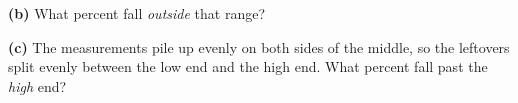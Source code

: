 \documentclass[12pt]{article}
\begin{document}
\begin{enumerate}[leftmargin=1.7em, itemsep=0.13in]
        \hspace{1.0em}\textbf{(b)} What percent fall \emph{outside} that range? 
        \vspace{3pt}

        \hspace{1.0em}\textbf{(c)} The measurements pile up evenly on both sides of the middle,
        so the leftovers split evenly between the low end and the high end. What percent fall
        past the \emph{high} end? 

\end{enumerate}
\end{document}
